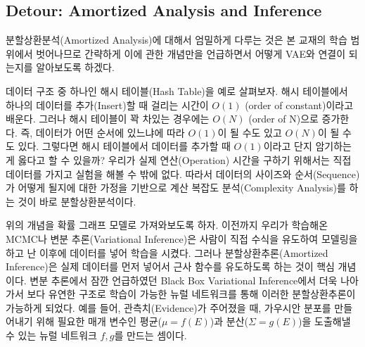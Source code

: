 \documentclass[draft=false]{oblivoir}
\begin{document}
\subsection{Detour: Amortized Analysis and Inference}
분할상환분석(Amortized Analysis)에 대해서 엄밀하게 다루는 것은 본 교재의 학습 범위에서 벗어나므로 간략하게 이에 관한 개념만을 언급하면서 어떻게 VAE와 연결이 되는지를 알아보도록 하겠다.

데이터 구조 중 하나인 해시 테이블(Hash Table)을 예로 살펴보자. 해시 테이블에서 하나의 데이터를 추가(Insert)할 때 걸리는 시간이 $O(1)$ (order of constant)이라고 배운다. 그러나 해시 테이블이 꽉 차있는 경우에는 $O(N)$ (order of N)으로 증가한다. 즉, 데이터가 어떤 순서에 있느냐에 따라 $O(1)$이 될 수도 있고 $O(N)$이 될 수도 있다. 그렇다면 해시 테이블에서 데이터를 추가할 때 $O(1)$이라고 단지 암기하는 게 옳다고 할 수 있을까? 우리가 실제 연산(Operation) 시간을 구하기 위해서는 직접 데이터를 가지고 실험을 해볼 수 밖에 없다. 따라서 데이터의 사이즈와 순서(Sequence)가 어떻게 될지에 대한 가정을 기반으로 계산 복잡도 분석(Complexity Analysis)를 하는 것이 바로 분할상환분석이다.

위의 개념을 확률 그래프 모델로 가져와보도록 하자. 이전까지 우리가 학습해온 MCMC나 변분 추론(Variational Inference)은 사람이 직접 수식을 유도하여 모델링을 하고 난 이후에 데이터를 넣어 학습을 시켰다. 그러나 분할상환추론(Amortized Inference)은 실제 데이터를 먼저 넣어서 근사 함수를 유도하도록 하는 것이 핵심 개념이다. 변분 추론에서 잠깐 언급하였던 Black Box Variational Inference에서 더욱 나아가서 보다 유연한 구조로 학습이 가능한 뉴럴 네트워크를 통해 이러한 분할상환추론이 가능하게 되었다. 예를 들어, 관측치(Evidence)가 주어졌을 때, 가우시안 분포를 만들어내기 위해 필요한 매개 변수인 평균($\mu = f(E)$)과 분산($\Sigma = g(E)$)을 도출해낼 수 있는 뉴럴 네트워크 $f, g$를 만드는 셈이다.

\end{document}
